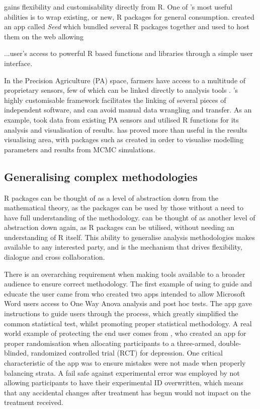  gains flexibility and customisability directly from R.  One of 's most useful abilities is to wrap existing, or new, R packages for general consumption.  \citet{beck_investigating_2014} created an app called \textit{Seed} which bundled several R packages together and used  to host them on the web allowing

\begin{displayquote}
	...user's access to powerful R based functions and libraries through a simple user interface. 
\end{displayquote}

In the Precision Agriculture (PA) space, farmers have access to a multitude of proprietary sensors, few of which can be linked directly to analysis tools \citep{jayaraman_internet_2016}.  's highly customisable framework facilitates the linking of several pieces of independent software, and can avoid manual data wrangling and transfer. As an example, \citet{jahanshiri_developing_2014} took data from existing PA sensors and utilised R functions for its analysis and visualisation of results.   has proved more than useful in the results visualising area, with packages such as  \citep{gabry_shinystan_2018} created in order to visualise modelling parameters and results from MCMC simulations.

\subsection{Generalising complex methodologies}

R packages can be thought of as a level of abstraction down from the mathematical theory, as the packages can be used by those without a need to have full understanding of the methodology.   can be thought of as another level of abstraction down again, as R packages can be utilised, without needing an understanding of R itself.  This ability to generalise analysis methodologies makes  available to any interested party, and is the mechanism that drives flexibility, dialogue and cross collaboration.

There is an overarching requirement when making tools available to a broader audience to ensure correct methodology.  The first example of using  to guide and educate the user came from \citet{assaad_rapid_2014} who created two  apps intended to allow Microsoft Word users access to One Way Anova analysis and post hoc tests.  The app gave instructions to guide users through the process, which greatly simplified the common statistical test, whilst promoting proper statistical methodology.  A real world example of protecting the end user comes from \citet{hsu_attentional_2018}, who created an app for proper randomisation when allocating participants to a three-armed, double-blinded, randomized controlled trial (RCT) for depression.  One critical characteristic of the app was to ensure mistakes were not made when properly balancing strata.  A fail safe against experimental error was employed by not allowing participants to have their experimental ID overwritten, which means that any accidental changes after treatment has begun would not impact on the treatment received.

